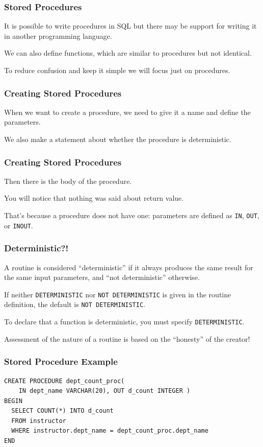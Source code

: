 \begin{frame}
\frametitle{Stored Procedures}

It is possible to write procedures in SQL but there may be support for writing it in another programming language.

We can also define functions, which are similar to procedures but not identical. 

To reduce confusion and keep it simple we will focus just on procedures. 

\end{frame}

\begin{frame}
\frametitle{Creating Stored Procedures}

When we want to create a procedure, we need to give it a name and define the parameters.

We also make a statement about whether the procedure is deterministic. 

\end{frame}

\begin{frame}
\frametitle{Creating Stored Procedures}

Then there is the body of the procedure.

You will notice that nothing was said about return value. 

That's because a procedure does not have one: parameters are defined as \texttt{IN}, \texttt{OUT}, or \texttt{INOUT}.

\end{frame}


\begin{frame}
\frametitle{Deterministic?!}

A routine is considered ``deterministic'' if it always produces the same result for the same input parameters, and ``not deterministic'' otherwise. 

If neither \texttt{DETERMINISTIC} nor \texttt{NOT DETERMINISTIC} is given in the routine definition, the default is \texttt{NOT DETERMINISTIC}. 

To declare that a function is deterministic, you must specify \texttt{DETERMINISTIC}.

Assessment of the nature of a routine is based on the ``honesty'' of the creator!

\end{frame}


\begin{frame}[fragile]
\frametitle{Stored Procedure Example}

{\small
\begin{verbatim}
CREATE PROCEDURE dept_count_proc( 
    IN dept_name VARCHAR(20), OUT d_count INTEGER )
BEGIN
  SELECT COUNT(*) INTO d_count
  FROM instructor
  WHERE instructor.dept_name = dept_count_proc.dept_name
END
\end{verbatim}
}

\end{frame}

